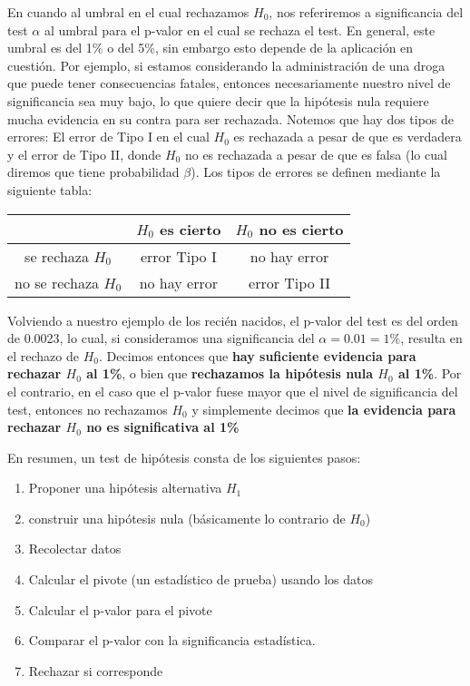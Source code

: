 En cuando al umbral en el cual rechazamos $H_0$, nos referiremos a significancia del test $\alpha$ al umbral para el p-valor en el cual se rechaza el test. En general, este umbral es del 1\% o del 5\%, sin embargo esto depende de la aplicación en cuestión. Por ejemplo, si estamos considerando la administración de una droga que puede tener consecuencias fatales, entonces necesariamente nuestro nivel de significancia sea muy bajo, lo que quiere decir que la hipótesis nula requiere mucha evidencia en su contra para ser rechazada. Notemos que hay dos tipos de errores: El error de Tipo I en el cual $H_0$ es rechazada a pesar de que es verdadera y el error de Tipo II, donde $H_0$ no es rechazada a pesar de que es falsa (lo cual diremos que tiene probabilidad $\beta$). Los tipos de errores se definen mediante la siguiente tabla:

\vspace{1em}
\begin{center}
	\begin{tabular}{c|cc}
			  & $H_0$ es cierto & $H_0$ no es cierto  \\
			\hline
			se rechaza $H_0$  & error Tipo I  & no hay error    \\
			no se rechaza $H_0$  & no hay error   & error Tipo II
	\end{tabular}
\end{center}

Volviendo a nuestro ejemplo de los recién nacidos, el p-valor del test es del orden de 0.0023, lo cual, si consideramos una significancia del $\alpha=0.01=1\%$, resulta en el rechazo de $H_0$. Decimos entonces que \textbf{ hay suficiente evidencia para rechazar $H_0$ al 1\%}, o bien que \textbf{ rechazamos la hipótesis nula $H_0$ al 1\%}. Por el contrario, en el caso que el p-valor fuese mayor que el nivel de significancia del test, entonces no rechazamos $H_0$ y simplemente decimos que \textbf{ la evidencia para rechazar $H_0$ no es significativa al 1\%}

\begin{tcolorbox}[title=Test de Hipótesis]
En resumen,  un test de hipótesis consta de los siguientes pasos: 

\begin{enumerate}
	\item Proponer una hipótesis alternativa $H_1$
	\item construir una hipótesis nula (básicamente lo contrario de $H_0$)
	\item Recolectar datos
	\item Calcular el pivote (un estadístico de prueba) usando los datos
	\item Calcular el p-valor para el pivote
	\item Comparar el p-valor con la significancia estadística. 
	\item Rechazar si corresponde
\end{enumerate}
\end{tcolorbox}

